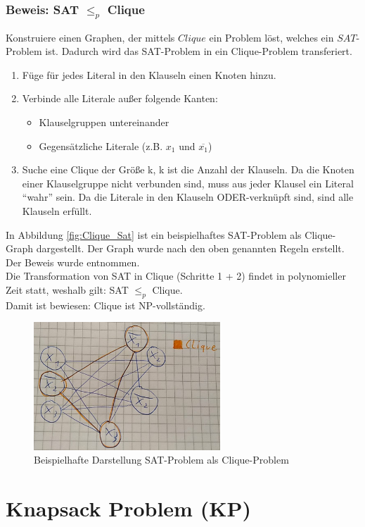 \documentclass[ngerman]{article}
\begin{document}
\subsubsection{Beweis: SAT $\le_p$ Clique}
\label{sec:SAT_Clique}
Konstruiere einen Graphen, der mittels \(Clique\) ein Problem löst, welches ein \(SAT\)-Problem ist.
Dadurch wird das SAT-Problem in ein Clique-Problem transferiert.
\begin{enumerate}
\item Füge für jedes Literal in den Klauseln einen Knoten hinzu.
\item Verbinde alle Literale außer folgende Kanten:
\begin{itemize}
\item Klauselgruppen untereinander
\item Gegensätzliche Literale (z.B. \(x_1\) und \(\overline{x_1}\))
\end{itemize}
\item Suche eine Clique der Größe k, k ist die Anzahl der Klauseln.
Da die Knoten einer Klauselgruppe nicht verbunden sind, muss aus jeder Klausel ein Literal ``wahr'' sein.
Da die Literale in den Klauseln ODER-verknüpft sind, sind alle Klauseln erfüllt.\\
\end{enumerate}
In Abbildung \vref{fig:Clique_Sat} ist ein beispielhaftes SAT-Problem als Clique-Graph dargestellt.
Der Graph wurde nach den oben genannten Regeln erstellt.
Der Beweis wurde \cite{weitz} entnommen.\\
Die Transformation von SAT in Clique (Schritte 1 + 2) findet in polynomieller Zeit statt, weshalb gilt: SAT $\le_p$ Clique.\\
Damit ist bewiesen: Clique ist NP-vollständig.
\begin{figure}[H]
	\centering
	\includegraphics[width=7cm]{figures/clique_sat.png}
	\caption{Beispielhafte Darstellung SAT-Problem als Clique-Problem}
	\label{fig:Clique_Sat}
\end{figure}

\section{Knapsack Problem (KP)}
\end{document}
